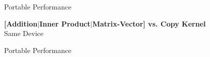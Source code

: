 \begin{frame}{Portable Performance}
  \begin{center} \textbf{ [Addition$|$Inner Product$|$Matrix-Vector] vs. Copy Kernel }\\[1em] Same Device \end{center}
\end{frame}

\begin{frame}{Portable Performance}

\end{frame}

